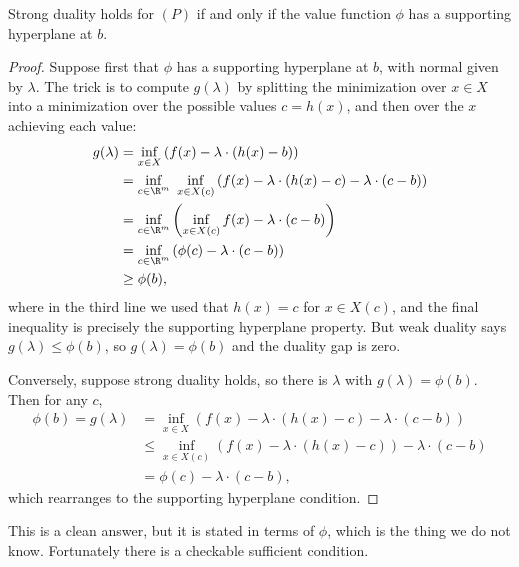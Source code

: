\documentclass[a4paper]{scrartcl}
\begin{document}
\begin{theorem}
    Strong duality holds for $(P)$ if and only if the value function $\phi$ has a supporting hyperplane at $b$.
\end{theorem}
\begin{proof}
    Suppose first that $\phi$ has a supporting hyperplane at $b$, with normal given by $\lambda$. The trick is to compute $g(\lambda)$ by splitting the minimization over $x \in X$ into a minimization over the possible values $c = h(x)$, and then over the $x$ achieving each value:
    \begin{align*}
        g(\lambda) &= \inf_{x \in X}\left(f(x) - \lambda\cdot(h(x) - b)\right)\\
        &= \inf_{c \in \R^m}\ \inf_{x \in X(c)}\left(f(x) - \lambda\cdot(h(x) - c) - \lambda\cdot(c - b)\right)\\
        &= \inf_{c \in \R^m}\left(\inf_{x \in X(c)}f(x) - \lambda\cdot(c - b)\right)\\
        &= \inf_{c \in \R^m}\left(\phi(c) - \lambda\cdot(c - b)\right)\\
        &\geq \phi(b),
    \end{align*}
    where in the third line we used that $h(x) = c$ for $x \in X(c)$, and the final inequality is precisely the supporting hyperplane property. But weak duality says $g(\lambda) \leq \phi(b)$, so $g(\lambda) = \phi(b)$ and the duality gap is zero.

    Conversely, suppose strong duality holds, so there is $\lambda$ with $g(\lambda) = \phi(b)$. Then for any $c$,
    \begin{align*}
        \phi(b) = g(\lambda) &= \inf_{x \in X}\left(f(x) - \lambda\cdot(h(x) - c) - \lambda\cdot(c - b)\right)\\
        &\leq \inf_{x \in X(c)}\left(f(x) - \lambda\cdot(h(x) - c)\right) - \lambda\cdot(c-b) \\
        &= \phi(c) - \lambda\cdot(c - b),
    \end{align*}
    which rearranges to the supporting hyperplane condition.
\end{proof}

This is a clean answer, but it is stated in terms of $\phi$, which is the thing we do not know. Fortunately there is a checkable sufficient condition.
\end{document}
